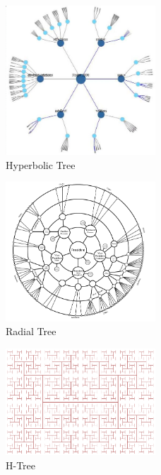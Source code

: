 \documentclass{article}
\begin{document}
\begin{figure}[h]
	\centering
	\includegraphics[width=0.5\textwidth]{_img/hyperbolic_tree.png}
	\caption{Hyperbolic Tree}
	\label{fig:hyperbolic_tree}
\end{figure}

\begin{figure}[h]
	\centering
	\includegraphics[width=0.5\textwidth]{_img/Radial_Tree.png}
	\caption{Radial Tree}
	\label{fig:radial_tree}
\end{figure}

\begin{figure}[h]
	\centering
	\includegraphics[width=0.5\textwidth]{_img/H-Tree.png}
	\caption{H-Tree}
	\label{fig:h-tree}
\end{figure}
\end{document}
